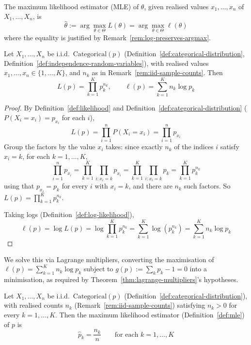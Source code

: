 		\begin{definition}
			\label{def:mle}
			The maximum likelihood estimator (MLE) of $\theta$, given realised values $x_1,\dots,x_n$ of $X_1,\dots,X_n$, is
			\[
				\hat\theta := \arg\max_{\theta\in\Theta} L(\theta) = \arg\max_{\theta\in\Theta} \ell(\theta)
			\]
			where the equality is justified by Remark~\ref{rem:log-preserves-argmax}.
		\end{definition}
		
		\begin{proposition}
			\label{prop:categorical-likelihood}
			Let $X_1,\dots,X_n$ be i.i.d.\ $\mathrm{Categorical}(p)$ (Definition~\ref{def:categorical-distribution}, Definition~\ref{def:independence-random-variables}), with realised values $x_1,\dots,x_n\in\{1,\dots,K\}$, and $n_k$ as in Remark~\ref{rem:iid-sample-counts}. Then
			\[
				L(p) = \prod_{k=1}^K p_k^{n_k}, \qquad \ell(p) = \sum_{k=1}^K n_k\log p_k
			\]
		\end{proposition}
		
		\begin{proof}
			By Definition~\ref{def:likelihood} and Definition~\ref{def:categorical-distribution} ($P(X_i=x_i)=p_{x_i}$ for each $i$),
			\[
				L(p) = \prod_{i=1}^n P(X_i=x_i) = \prod_{i=1}^n p_{x_i}
			\]
			Group the factors by the value $x_i$ takes: since exactly $n_k$ of the indices $i$ satisfy $x_i=k$, for each $k=1,\dots,K$,
			\[
				\prod_{i=1}^n p_{x_i} = \prod_{k=1}^K \prod_{i:x_i=k} p_{x_i} = \prod_{k=1}^K \prod_{i:x_i=k} p_k = \prod_{k=1}^K p_k^{n_k}
			\]
			using that $p_{x_i}=p_k$ for every $i$ with $x_i=k$, and there are $n_k$ such factors. So $L(p) = \prod_{k=1}^K p_k^{n_k}$.
			
			Taking logs (Definition~\ref{def:log-likelihood}),
			\[
				\ell(p) = \log L(p) = \log\prod_{k=1}^K p_k^{n_k} = \sum_{k=1}^K \log(p_k^{n_k}) = \sum_{k=1}^K n_k\log p_k
			\]
		\end{proof}
		
		We solve this via Lagrange multipliers, converting the maximisation of $\ell(p) = \sum_{k=1}^K n_k\log p_k$ subject to $g(p):=\sum_kp_k-1=0$ into a minimisation, as required by Theorem~\ref{thm:lagrange-multipliers}'s hypotheses.
		
		\begin{proposition}
			\label{prop:categorical-mle}
			Let $X_1,\dots,X_n$ be i.i.d.\ $\mathrm{Categorical}(p)$ (Definition~\ref{def:categorical-distribution}), with realised counts $n_k$ (Remark~\ref{rem:iid-sample-counts}) satisfying $n_k>0$ for every $k=1,\dots,K$. Then the maximum likelihood estimator (Definition~\ref{def:mle}) of $p$ is
			\[
				\hat p_k = \frac{n_k}{n} \qquad \text{for each } k=1,\dots,K
			\]
		\end{proposition}
		
